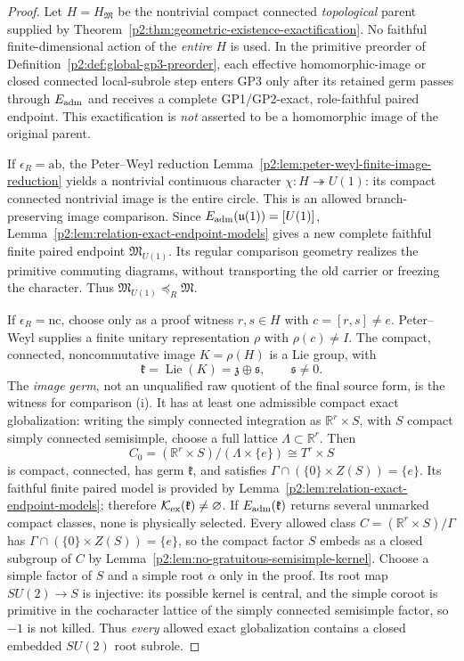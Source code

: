 \documentclass[12pt,a4paper]{article}
\begin{document}
\begin{proof}
Let \(H=H_{\mathfrak M}\) be the nontrivial compact
connected \emph{topological} parent supplied by
Theorem~\ref{p2:thm:geometric-existence-exactification}.  No faithful
finite-dimensional action of the \emph{entire} \(H\) is used.  In the primitive
preorder of Definition~\ref{p2:def:global-gp3-preorder}, each effective
homomorphic-image or closed connected local-subrole step enters GP3 only
after its retained germ passes through \(E_{\rm adm}\) and receives a
complete GP1/GP2-exact, role-faithful paired endpoint.  This exactification
is \emph{not} asserted to be a homomorphic image of the original parent.

If \(\epsilon_R=\mathrm{ab}\), the Peter--Weyl reduction
Lemma~\ref{p2:lem:peter-weyl-finite-image-reduction} yields a nontrivial
continuous character \(\chi:H\twoheadrightarrow U(1)\): its compact
connected nontrivial image is the entire circle.  This is an allowed
branch-preserving image comparison.  Since
\(E_{\rm adm}(\mathfrak u(1))=[U(1)]\),
Lemma~\ref{p2:lem:relation-exact-endpoint-models} gives a new complete
faithful finite paired endpoint \(\mathfrak M_{U(1)}\).  Its regular
comparison geometry realizes the primitive commuting diagrams, without
transporting the old carrier or freezing the character.  Thus
\(\mathfrak M_{U(1)}\preceq_R\mathfrak M\).

If \(\epsilon_R=\mathrm{nc}\), choose only as a proof witness
\(r,s\in H\) with \(c=[r,s]\ne e\).  Peter--Weyl supplies a finite
unitary representation \(\rho\) with \(\rho(c)\ne I\).  The compact,
connected, noncommutative image \(K=\rho(H)\) is a Lie group, with
\[
 \mathfrak k=\operatorname{Lie}(K)=\mathfrak z\oplus\mathfrak s,
 \qquad\mathfrak s\ne0.
\]
The \emph{image germ}, not an unqualified raw quotient of the final source
form, is the witness for comparison (i).  It has at least one admissible
compact exact globalization: writing the simply connected integration
as \(\mathbb R^r\times S\), with \(S\) compact simply connected
semisimple, choose a full lattice \(\Lambda\subset\mathbb R^r\).  Then
\[
 C_0=(\mathbb R^r\times S)/(\Lambda\times\{e\})
       \cong T^r\times S
\]
is compact, connected, has germ \(\mathfrak k\), and satisfies
\(\Gamma\cap(\{0\}\times Z(S))=\{e\}\).  Its faithful finite paired
model is provided by
Lemma~\ref{p2:lem:relation-exact-endpoint-models}; therefore
\(\mathcal K_{\rm ex}(\mathfrak k)\ne\varnothing\).
If \(E_{\rm adm}(\mathfrak k)\) returns several unmarked compact classes,
none is physically selected.  Every allowed class
\(C=(\mathbb R^r\times S)/\Gamma\) has
\(\Gamma\cap(\{0\}\times Z(S))=\{e\}\), so the compact factor \(S\)
embeds as a closed subgroup of \(C\) by
Lemma~\ref{p2:lem:no-gratuitous-semisimple-kernel}.
Choose a simple factor of \(S\) and a simple root \(\alpha\) only in the
proof.  Its root map \(SU(2)\to S\) is injective: its possible kernel is
central, and the simple coroot is primitive in the cocharacter lattice of
the simply connected semisimple factor, so \(-1\) is not killed.  Thus
\emph{every} allowed exact globalization contains a closed embedded
\(SU(2)\) root subrole.


\end{proof}
\end{document}
